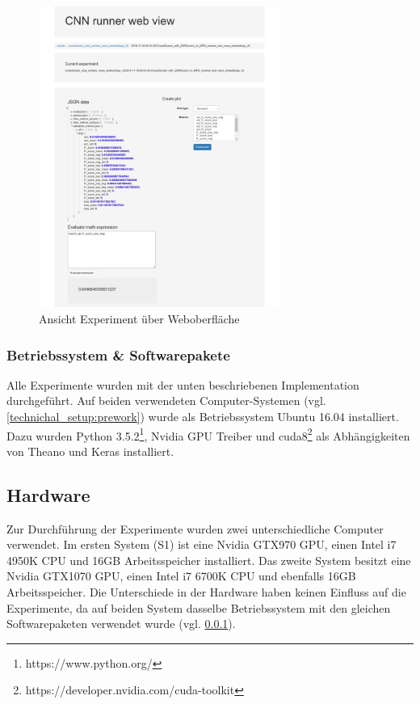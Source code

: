 \begin{figure}[htbp]
	\centering
	\includegraphics[width=0.7\textwidth]{img/web_gui}
	\caption{Ansicht Experiment über Weboberfläche}
	\label{fig:web_gui}
\end{figure}
\subsubsection{Betriebssystem \& Softwarepakete}
\label{technical_setup:software}
Alle Experimente wurden mit der unten beschriebenen Implementation durchgeführt. Auf beiden verwendeten Computer-Systemen (vgl. \ref{technichal_setup:prework}) wurde als Betriebssystem Ubuntu 16.04 installiert. Dazu wurden Python 3.5.2\footnote{https://www.python.org/}, Nvidia GPU Treiber und cuda8\footnote{https://developer.nvidia.com/cuda-toolkit} als Abhängigkeiten von Theano und Keras installiert.

\subsection{Hardware}
\label{technichal_setup:hardware}
Zur Durchführung der Experimente wurden zwei unterschiedliche Computer verwendet. Im ersten System (S1) ist eine Nvidia GTX970 GPU, einen Intel i7 4950K CPU und 16GB Arbeitsspeicher installiert. Das zweite System besitzt eine Nvidia GTX1070 GPU, einen Intel i7 6700K CPU und ebenfalls 16GB Arbeitsspeicher. Die Unterschiede in der Hardware haben keinen Einfluss auf die Experimente, da auf beiden System dasselbe Betriebssystem mit den gleichen Softwarepaketen verwendet wurde (vgl. \ref{technical_setup:software}).

